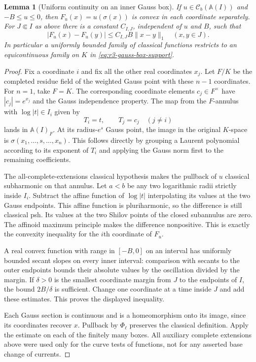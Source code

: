 \documentclass[11pt,a4paper]{article}
\numberwithin{equation}{section}
\newtheorem{lemma}[theorem]{Lemma}
\theoremstyle{definition}
\theoremstyle{remark}
\newcommand{\Cb}{\mathcal C_b}
\begin{document}
\begin{lemma}[Uniform continuity on an inner Gauss box]
\label{lem:r3-gauss-box-equicontinuity}
If $u\in\Cb(\mathbb A(I))$ and $-B\leq u\leq0$, then
$F_u(x)=u(\sigma(x))$ is convex in each coordinate separately.
For $J\Subset I$ as above there is a constant $C_{I,J}$,
independent of $u$ and $B$, such that
\[
 |F_u(x)-F_u(y)|\leq C_{I,J}B\|x-y\|_1
                         \quad(x,y\in J).
\]
In particular a uniformly bounded family of classical functions
restricts to an equicontinuous family on $K$ in
\eqref{eq:r3-gauss-box-support}.
\end{lemma}

\begin{proof}
Fix a coordinate $i$ and fix all the other real coordinates $x_j$.
Let $F/K$ be the completed residue field of the weighted Gauss
point with these $n-1$ coordinates. For $n=1$, take $F=K$.
The corresponding coordinate elements $c_j\in F^\times$ have
$|c_j|=e^{x_j}$ and the Gauss independence property. The map from
the $F$-annulus with $\log|t|\in I_i$ given by
\[
 T_i=t,\qquad T_j=c_j\quad(j\ne i)
\]
lands in $\mathbb A(I)_F$. At its radius-$e^s$ Gauss point,
the image in the original $K$-space is
$\sigma(x_1,\ldots,s,\ldots,x_n)$. This follows directly by
grouping a Laurent polynomial according to its exponent of $T_i$
and applying the Gauss norm first to the remaining coefficients.

The all-complete-extensions classical hypothesis makes the
pullback of $u$ classical subharmonic on that annulus. Let
$a<b$ be any two logarithmic radii strictly inside $I_i$.
Subtract the affine function of $\log|t|$ interpolating its
values at the two Gauss endpoints. This affine function is
pluriharmonic, so the difference is still classical psh.
Its values at the two Shilov points of the closed subannulus
are zero. The affinoid maximum principle
\cite[Theorem~6.4]{GR25} makes the difference nonpositive.
This is exactly the convexity inequality for the $i$th
coordinate of $F_u$.

A real convex function with range in $[-B,0]$ on an interval
has uniformly bounded secant slopes on every inner interval:
comparison with secants to the outer endpoints bounds their
absolute values by the oscillation divided by the margin.
If $\delta>0$ is the smallest coordinate margin from $J$ to
the endpoints of $I$, the bound $2B/\delta$ is sufficient.
Change one coordinate at a time inside $J$ and add these
estimates. This proves the displayed inequality.

Each Gauss section is continuous and is a homeomorphism onto
its image, since its coordinates recover $x$. Pullback by
$\Phi_\ell$ preserves the classical definition. Apply the
estimate on each of the finitely many boxes. All auxiliary
complete extensions above were used only for the curve tests
of functions, not for any asserted base change of currents.
\end{proof}
\end{document}

